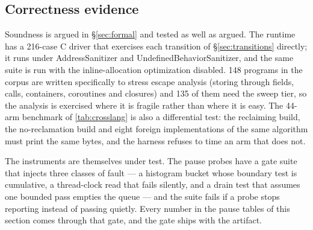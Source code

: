 \subsection{Correctness evidence}
\label{sec:eval-correct}

Soundness is argued in \S\ref{sec:formal} and tested as well as argued.  The runtime has a
216-case C driver that exercises each transition of \S\ref{sec:transitions} directly; it runs
under AddressSanitizer and UndefinedBehaviorSanitizer, and the same suite is run with the
inline-allocation optimization disabled.  148 programs in the corpus are written specifically to
stress escape analysis (storing through fields, calls, containers, coroutines and closures) and
135 of them need the sweep tier, so the analysis is exercised where it is fragile rather than
where it is easy.  The 44-arm benchmark of \tab\ref{tab:crosslang} is also a differential test:
the reclaiming build, the no-reclamation build and eight foreign implementations of the same
algorithm must print the same bytes, and the harness refuses to time an arm that does not.

The instruments are themselves under test.  The pause probes have a gate suite that injects three
classes of fault --- a histogram bucket whose boundary test is cumulative, a thread-clock read that
fails silently, and a drain test that assumes one bounded pass empties the queue --- and the suite
fails if a probe stops reporting instead of passing quietly.  Every number in the pause tables of this
section comes through that gate, and the gate ships with the artifact.
